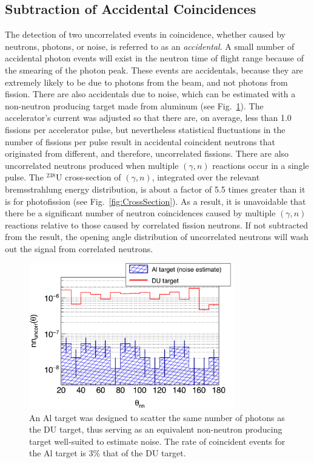 \FloatBarrier
\subsection{Subtraction of Accidental Coincidences}
\label{Reconstruction of Accidental Coincidence}
The detection of two uncorrelated events in coincidence, whether caused by neutrons, photons, or noise, is referred to as an \emph{accidental}.
A small number of accidental photon events will exist in the neutron time of flight range because of the smearing of the photon peak.
These events are accidentals, because they are extremely likely to be due to photons from the beam, and not photons from fission.
There are also accidentals due to noise, which can be estimated with a non-neutron producing target made from aluminum (see Fig.~\ref{fig:Noise}).
The accelerator's current was adjusted so that there are, on average, less than 1.0 fissions per accelerator pulse, but nevertheless statistical fluctuations in the number of fissions per pulse result in accidental coincident neutrons that originated from different, and therefore, uncorrelated fissions.
There are also uncorrelated neutrons produced when multiple $(\gamma, n)$ reactions occur in a single pulse.
The $^{238}$U cross-section of $(\gamma, n)$, integrated over the relevant bremsstrahlung energy distribution, is about a factor of 5.5 times greater than it is for photofission (see Fig.~\ref{fig:CrossSection}).
As a result, it is unavoidable that there be a significant number of neutron coincidences caused by multiple $(\gamma, n)$ reactions relative to those caused by correlated fission neutrons.
If not subtracted from the result, the opening angle distribution of uncorrelated neutrons will wash out the signal from correlated neutrons. 
\begin{figure}[]
\centering
    \includegraphics[width=0.8\textwidth]{Content/Methods/Noise.png}
    \caption{An Al target was designed to scatter the same number of photons as the DU target, thus serving as an equivalent non-neutron producing target well-suited to estimate noise.
    The rate of coincident events for the Al target is 3\% that of the DU target. 
        }
    \label{fig:Noise}
\end{figure}
